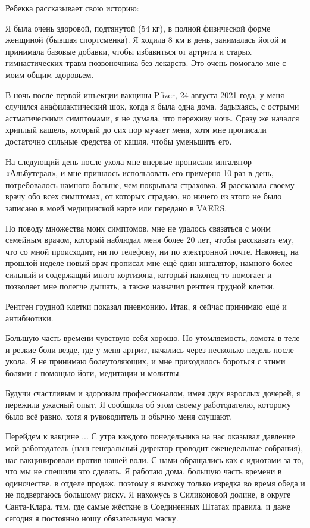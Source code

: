 Ребекка рассказывает свою историю:

Я была очень здоровой, подтянутой (54 кг), в полной физической форме женщиной
(бывшая спортсменка). Я ходила 8 км в день, занималась йогой и принимала базовые
добавки, чтобы избавиться от артрита и старых гимнастических травм позвоночника
без лекарств. Это очень помогало мне с моим общим здоровьем.

В ночь после первой инъекции вакцины Pfizer, 24 августа 2021 года, у меня
случился анафилактический шок, когда я была одна дома. Задыхаясь, с острыми
астматическими симптомами, я не думала, что переживу ночь. Сразу же начался
хриплый кашель, который до сих пор мучает меня, хотя мне прописали достаточно
сильные средства от кашля, чтобы уменьшить его.

На следующий день после укола мне впервые прописали ингалятор «Альбутерал», и
мне пришлось использовать его примерно 10 раз в день, потребовалось намного
больше, чем покрывала страховка. Я рассказала своему врачу обо всех симптомах,
от которых страдаю, но ничего из этого не было записано в моей медицинской карте
или передано в VAERS.

По поводу множества моих симптомов, мне не удалось связаться с моим семейным
врачом, который наблюдал меня более 20 лет, чтобы рассказать ему, что со мной
происходит, ни по телефону, ни по электронной почте. Наконец, на прошлой неделе
новый врач прописал мне ещё один ингалятор, намного более сильный и содержащий
много кортизона, который наконец-то помогает и позволяет мне полегче дышать, а
также назначил рентген грудной клетки.

Рентген грудной клетки показал пневмонию. Итак, я сейчас принимаю ещё и
антибиотики.

Большую часть времени чувствую себя хорошо. Но утомляемость, ломота в теле и
резкие боли везде, где у меня артрит, начались через несколько недель после
укола. Я не принимаю болеутоляющих, и мне приходилось бороться с этими болями с
помощью йоги, медитации и молитвы.

Будучи счастливым и здоровым профессионалом, имея двух взрослых дочерей, я
пережила ужасный опыт. Я сообщила об этом своему работодателю, которому было всё
равно, хотя я руководитель и обычно меня слушают.

Перейдем к вакцине ...  С утра каждого понедельника на нас оказывал давление мой
работодатель (наш генеральный директор проводит еженедельные собрания), нас
вакцинировали против нашей воли. С нами обращались как с идиотами за то, что мы
не спешили это сделать. Я работаю дома, большую часть времени в одиночестве, в
отделе продаж, поэтому я выхожу только изредка во время обеда и не подвергаюсь
большому риску. Я нахожусь в Силиконовой долине, в округе Санта-Клара, там, где
самые жёсткие в Соединенных Штатах правила, и даже сегодня я постоянно ношу
обязательную маску.

